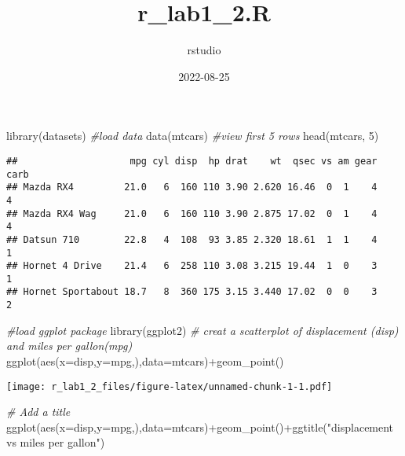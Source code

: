 \documentclass[
]{article}
\title{r\_lab1\_2.R}
\author{rstudio}
\date{2022-08-25}
\newenvironment{Shaded}{\begin{snugshade}}{\end{snugshade}}
\newcommand{\AttributeTok}[1]{\textcolor[rgb]{0.77,0.63,0.00}{#1}}
\newcommand{\CommentTok}[1]{\textcolor[rgb]{0.56,0.35,0.01}{\textit{#1}}}
\newcommand{\DecValTok}[1]{\textcolor[rgb]{0.00,0.00,0.81}{#1}}
\newcommand{\FunctionTok}[1]{\textcolor[rgb]{0.00,0.00,0.00}{#1}}
\newcommand{\NormalTok}[1]{#1}
\newcommand{\SpecialCharTok}[1]{\textcolor[rgb]{0.00,0.00,0.00}{#1}}
\newcommand{\StringTok}[1]{\textcolor[rgb]{0.31,0.60,0.02}{#1}}
\begin{document}
\maketitle

\begin{Shaded}
\begin{Highlighting}[]
\FunctionTok{library}\NormalTok{(datasets)}
\CommentTok{\#load data}
\FunctionTok{data}\NormalTok{(mtcars)}
\CommentTok{\#view first 5 rows}
\FunctionTok{head}\NormalTok{(mtcars, }\DecValTok{5}\NormalTok{)}
\end{Highlighting}
\end{Shaded}

\begin{verbatim}
##                    mpg cyl disp  hp drat    wt  qsec vs am gear carb
## Mazda RX4         21.0   6  160 110 3.90 2.620 16.46  0  1    4    4
## Mazda RX4 Wag     21.0   6  160 110 3.90 2.875 17.02  0  1    4    4
## Datsun 710        22.8   4  108  93 3.85 2.320 18.61  1  1    4    1
## Hornet 4 Drive    21.4   6  258 110 3.08 3.215 19.44  1  0    3    1
## Hornet Sportabout 18.7   8  360 175 3.15 3.440 17.02  0  0    3    2
\end{verbatim}

\begin{Shaded}
\begin{Highlighting}[]
\CommentTok{\#load ggplot package}
\FunctionTok{library}\NormalTok{(ggplot2)}
\CommentTok{\# creat a scatterplot of displacement (disp) and miles per gallon(mpg)}
\FunctionTok{ggplot}\NormalTok{(}\FunctionTok{aes}\NormalTok{(}\AttributeTok{x=}\NormalTok{disp,}\AttributeTok{y=}\NormalTok{mpg,),}\AttributeTok{data=}\NormalTok{mtcars)}\SpecialCharTok{+}\FunctionTok{geom\_point}\NormalTok{()}
\end{Highlighting}
\end{Shaded}

\texttt{[image: r\_lab1\_2\_files/figure-latex/unnamed-chunk-1-1.pdf]}

\begin{Shaded}
\begin{Highlighting}[]
\CommentTok{\# Add a title}
\FunctionTok{ggplot}\NormalTok{(}\FunctionTok{aes}\NormalTok{(}\AttributeTok{x=}\NormalTok{disp,}\AttributeTok{y=}\NormalTok{mpg,),}\AttributeTok{data=}\NormalTok{mtcars)}\SpecialCharTok{+}\FunctionTok{geom\_point}\NormalTok{()}\SpecialCharTok{+}\FunctionTok{ggtitle}\NormalTok{(}\StringTok{"displacement vs miles per gallon"}\NormalTok{)}
\end{Highlighting}
\end{Shaded}
\end{document}

